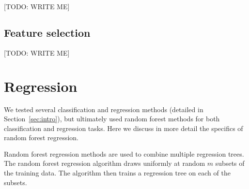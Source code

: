 \documentclass{article} %
\begin{document}
[TODO: WRITE ME]

\subsection{Feature selection}
\label{sec:featureselection}

[TODO: WRITE ME]






\section{Regression}
\label{sec:regression}

We tested several classification and regression methods (detailed in Section~\ref{sec:intro}), but ultimately used random forest methods for both classification and regression tasks. Here we discuss in more detail the specifics of random forest regression.

Random forest regression methods are used to combine multiple regression trees. The random forest regression algorithm draws uniformly at random $m$ subsets of the training data. The algorithm then trains a regression tree on each of the subsets.
\end{document}
